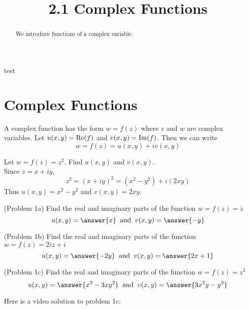 \documentclass[handout]{ximera}
\title{2.1 Complex Functions}
\begin{document}
\begin{abstract}
We introduce functions of a complex variable.
\end{abstract}

\maketitle
test
\section{Complex Functions}

A complex function has the form $w = f(z)$ where $z$ and $w$ are complex variables.
Let $u(x,y) = \operatorname{Re}(f)$ and $v(x,y) = \operatorname{Im}(f)$. Then we can write 
\[
w = f(z) = u(x,y) + iv(x,y)
\]



\begin{example}[Example 1] 
Let $w = f(z) = z^2$. Find $u(x,y)$ and $v(x,y)$.\\
Since $z = x+iy$, 
\[
z^2 = (x+iy)^2 = \left(x^2 - y^2\right) + i(2xy)
\]
Thus $u(x,y) = x^2 - y^2$ and $v(x,y) = 2xy$.

\end{example}




\begin{problem}(Problem 1a)
Find the real and imaginary parts of the function $w = f(z) = \overline{z}$
\[
u(x,y) = \answer{x} \;\; \mbox{and} \;\; v(x,y) = \answer{-y}
\]

\end{problem}


\begin{problem}(Problem 1b)
Find the real and imaginary parts of the function $w = f(z) = 2iz+i$     
\[
u(x,y) = \answer{-2y} \;\; \mbox{and} \;\; v(x,y) = \answer{2x+1}
\]

\end{problem}


\begin{problem}(Problem 1c)
Find the real and imaginary parts of the function $w = f(z) = z^3$   
\[
u(x,y) = \answer{x^3 - 3xy^2} \;\; \mbox{and} \;\; v(x,y) = \answer{3x^2y -y^3}
\]

\end{problem}

Here is a video solution to problem 1c:\\
\begin{foldable}
\end{foldable}
\end{document}
